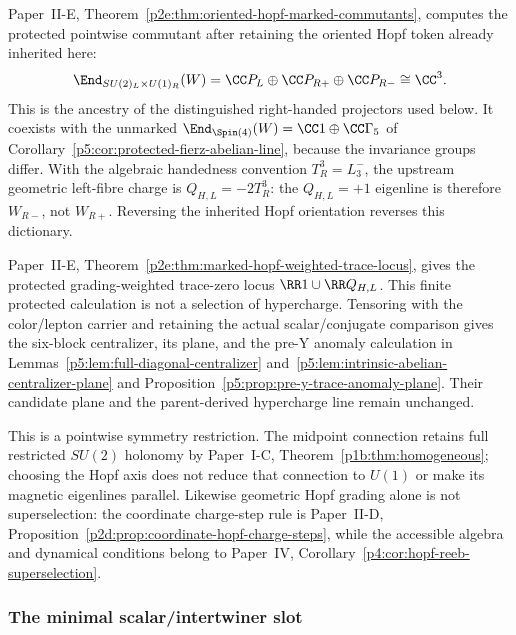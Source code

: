 \documentclass[12pt,a4paper]{article}
\begin{document}
\begin{remark}
\label{p5:rem:oriented-hopf-marked-ancestry}
Paper~II-E, Theorem~\ref{p2e:thm:oriented-hopf-marked-commutants},
computes the protected pointwise commutant after retaining the oriented
Hopf token already inherited here:
\[
 \End_{SU(2)_L\times U(1)_R}(W)
 =\CC P_L\oplus\CC P_{R+}\oplus\CC P_{R-}\cong\CC^3.
\]
This is the ancestry of the distinguished right-handed projectors used
below.  It coexists with the unmarked
\(\End_{\Spin(4)}(W)=\CC1\oplus\CC\Gamma_5\) of
Corollary~\ref{p5:cor:protected-fierz-abelian-line}, because the invariance
groups differ.  With the algebraic handedness convention
\(T_R^3=L_3^-\), the upstream geometric left-fibre charge is
\(Q_{H,L}=-2T_R^3\): the \(Q_{H,L}=+1\) eigenline is therefore
\(W_{R-}\), not \(W_{R+}\).  Reversing the inherited Hopf orientation
reverses this dictionary.

Paper~II-E, Theorem~\ref{p2e:thm:marked-hopf-weighted-trace-locus},
gives the protected grading-weighted trace-zero locus
\(\RR1\cup\RR Q_{H,L}\).  This finite protected calculation is not a
selection of hypercharge.  Tensoring with the color/lepton carrier and
retaining the actual scalar/conjugate comparison gives the six-block
centralizer, its plane, and the pre-Y anomaly calculation in
Lemmas~\ref{p5:lem:full-diagonal-centralizer}
and~\ref{p5:lem:intrinsic-abelian-centralizer-plane} and
Proposition~\ref{p5:prop:pre-y-trace-anomaly-plane}.  Their candidate plane
and the parent-derived hypercharge line remain unchanged.

This is a pointwise symmetry restriction.  The midpoint connection retains
full restricted \(SU(2)\) holonomy by Paper~I-C,
Theorem~\ref{p1b:thm:homogeneous}; choosing the Hopf axis does not reduce
that connection to \(U(1)\) or make its magnetic eigenlines parallel.
Likewise geometric Hopf grading alone is not superselection: the coordinate
charge-step rule is Paper~II-D,
Proposition~\ref{p2d:prop:coordinate-hopf-charge-steps}, while the accessible
algebra and dynamical conditions belong to Paper~IV,
Corollary~\ref{p4:cor:hopf-reeb-superselection}.
\end{remark}

\subsubsection{The minimal scalar/intertwiner slot}
\label{p5:sec:part1-native-scalar}
\label{p5:sec:part1-higgs}
\end{document}
